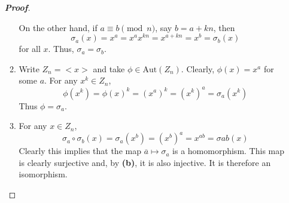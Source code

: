 \documentclass[12pt,leqno]{book}
\theoremstyle{definition}
\newenvironment{Proof}{\begin{proof}[\textnormal{\textbf{Proof}}]}{\end{proof}}
\begin{document}
\begin{enumerate}
\begin{Proof}
\begin{enumerate}
On the other hand, if $a\equiv b\pmod{n}$, say $b=a+kn$, then \[\sigma_a(x)=x^a=x^ax^{kn}=x^{a+kn}=x^b=\sigma_b(x)\] for all $x$. Thus, $\sigma_a=\sigma_b$.
  \item Write $Z_n=<x>$ and take $\phi\in\text{Aut}(Z_n)$. Clearly, $\phi(x)=x^a$ for some $a$. For any $x^k\in Z_n$, \[\phi(x^k)=\phi(x)^k=(x^a)^k=(x^k)^a=\sigma_a(x^k)\] Thus $\phi=\sigma_a$.
  \item For any $x\in Z_n$, \[\sigma_a\circ\sigma_b(x)=\sigma_a(x^b)=(x^b)^a=x^{ab}=\sigma{ab}(x)\] Clearly this implies that the map $\overline{a}\mapsto\sigma_a$ is a homomorphism. This map is clearly surjective and, by \textbf{(b)}, it is also injective. It is therefore an isomorphism.
 \end{enumerate}

\end{Proof}

\end{enumerate}
\end{document}
